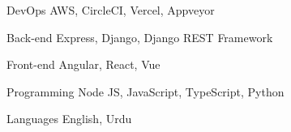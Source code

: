 

\begin{cvskills}

  \cvskill
    {DevOps} %
    {AWS, CircleCI, Vercel, Appveyor} %

  \cvskill
    {Back-end} %
    {Express, Django, Django REST Framework} %

  \cvskill
    {Front-end} %
    {Angular, React, Vue} %

  \cvskill
    {Programming} %
    {Node JS, JavaScript, TypeScript, Python} %

  \cvskill
    {Languages} %
    {English, Urdu} %

\end{cvskills}
